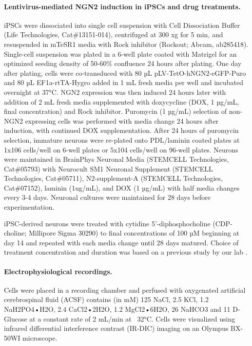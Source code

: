 \paragraph{Lentivirus-mediated NGN2 induction in iPSCs and drug treatments.}
iPSCs were dissociated into single cell suspension with Cell Dissociation Buffer (Life Technologies, Cat\#13151-014), centrifuged at 300 xg for 5 min, and resuspended in mTeSR1 media with Rock inhibitor (Rockout; Abcam, ab285418). Single-cell suspension was plated in a 6-well plate coated with Matrigel for an optimized seeding density of 50-60\% confluence 24 hours after plating. One day after plating, cells were co-transduced with 80 µL pLV-TetO-hNGN2-eGFP-Puro and 80 µL EF1a-rtTA-Hygro added in 1 mL fresh media per well and incubated overnight at 37°C. NGN2 expression was then induced 24 hours later with addition of 2 mL fresh media supplemented with doxycycline (DOX, 1 µg/mL, final concentration) and Rock inhibitor. Puromycin (1 µg/mL) selection of non-NGN2 expressing cells was performed with media change 24 hours after induction, with continued DOX supplementation. After 24 hours of puromycin selection, immature neurons were re-plated onto PDL/laminin coated plates at 1x106 cells/well on 6-well plates or 5x104 cells/well on 96-well plates. Neurons were maintained in BrainPhys Neuronal Media (STEMCELL Technologies, Cat\#05793) with Neurocult SM1 Neuronal Supplement (STEMCELL Technologies, Cat\#05711), N2-supplement-A (STEMCELL Technologies, Cat\#07152), laminin (1ug/mL), and DOX (1 µg/mL) with half media changes every 3-4 days. Neuronal cultures were maintained for 28 days before experimentation.

iPSC-derived neurons were treated with cytidine 5’-diphosphocholine (CDP-choline; Millipore Sigma 30290) to final concentrations of 100 µM beginning at day 14 and repeated with each media change until 28 days matured. Choice of treatment concentration and duration was based on a previous study by our lab \cite{Sienski2021-zt}.

\paragraph{Electrophysiological recordings.}
Cells were placed in a recording chamber and perfused with oxygenated artificial cerebrospinal fluid (ACSF) contains (in mM) 125 NaCl, 2.5 KCl, 1.2 NaH2PO4•H2O, 2.4 CaCl2•2H2O, 1.2 MgCl2•6H2O, 26 NaHCO3 and 11 D-Glucose at a constant rate of 2 mL/min at ~32°C. Cells were visualized using infrared differential interference contrast (IR-DIC) imaging on an Olympus BX-50WI microscope.


